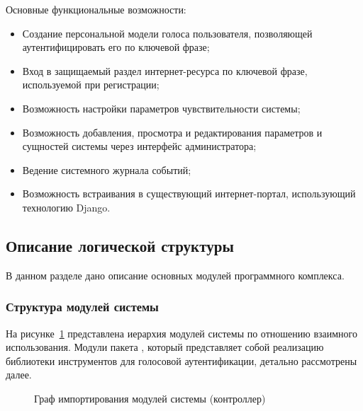 Основные функциональные возможности:
\begin{itemize}
\item Создание персональной модели голоса пользователя, позволяющей
аутентифицировать его по ключевой фразе;
\item Вход в защищаемый раздел интернет-ресурса по ключевой фразе, используемой
при регистрации;
\item Возможность настройки параметров чувствительности системы;
\item Возможность добавления, просмотра и редактирования параметров и сущностей
системы через интерфейс администратора;
\item Ведение системного журнала событий;
\item Возможность встраивания в существующий интернет-портал, использующий
технологию Django.
\end{itemize}

\subsection{Описание логической структуры}

В данном разделе дано описание основных модулей программного комплекса.

\subsubsection*{Структура модулей системы}



На рисунке~\ref{fig:import_graph} представлена иерархия модулей системы по
отношению взаимного использования. Модули
пакета , который представляет собой реализацию библиотеки
инструментов для голосовой аутентификации, детально рассмотрены далее.

\begin{figure}[ht!]
\center{\scalebox{0.77}{}}
\caption{Граф импортирования модулей системы (контроллер)}
\label{fig:import_graph}
\end{figure}

